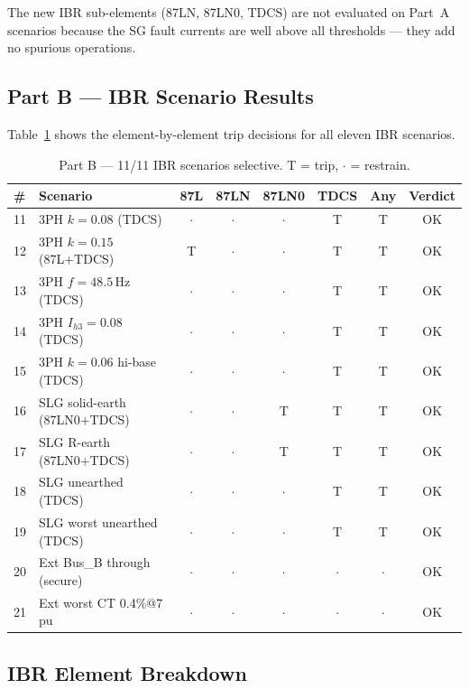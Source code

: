 \documentclass[11pt,a4paper]{article}
\begin{document}
The new IBR sub-elements (87LN, 87LN0, TDCS) are not evaluated on Part~A
scenarios because the SG fault currents are well above all thresholds —
they add no spurious operations.

\subsection{Part B — IBR Scenario Results}

Table~\ref{tab:partb} shows the element-by-element trip decisions for all
eleven IBR scenarios.

\begin{table}[h!]
\centering
\caption{Part B — 11/11 IBR scenarios selective.
         T = trip, $\cdot$ = restrain.}
\label{tab:partb}
\setlength{\tabcolsep}{4pt}
\begin{tabular}{llcccccc}
\toprule
\# & Scenario & 87L & 87LN & 87LN0 & TDCS & Any & Verdict \\
\midrule
11 & 3PH $k=0.08$ (TDCS)          & $\cdot$ & $\cdot$ & $\cdot$ & T & T & OK \\
12 & 3PH $k=0.15$ (87L+TDCS)      & T       & $\cdot$ & $\cdot$ & T & T & OK \\
13 & 3PH $f=48.5$\,Hz (TDCS)      & $\cdot$ & $\cdot$ & $\cdot$ & T & T & OK \\
14 & 3PH $I_{h3}=0.08$ (TDCS)     & $\cdot$ & $\cdot$ & $\cdot$ & T & T & OK \\
15 & 3PH $k=0.06$ hi-base (TDCS)  & $\cdot$ & $\cdot$ & $\cdot$ & T & T & OK \\
16 & SLG solid-earth (87LN0+TDCS) & $\cdot$ & $\cdot$ & T       & T & T & OK \\
17 & SLG R-earth (87LN0+TDCS)     & $\cdot$ & $\cdot$ & T       & T & T & OK \\
18 & SLG unearthed (TDCS)         & $\cdot$ & $\cdot$ & $\cdot$ & T & T & OK \\
19 & SLG worst unearthed (TDCS)   & $\cdot$ & $\cdot$ & $\cdot$ & T & T & OK \\
20 & Ext Bus\_B through (secure)   & $\cdot$ & $\cdot$ & $\cdot$ & $\cdot$ & $\cdot$ & OK \\
21 & Ext worst CT 0.4\%@7\,pu     & $\cdot$ & $\cdot$ & $\cdot$ & $\cdot$ & $\cdot$ & OK \\
\bottomrule
\end{tabular}
\end{table}

\subsection{IBR Element Breakdown}
\end{document}
